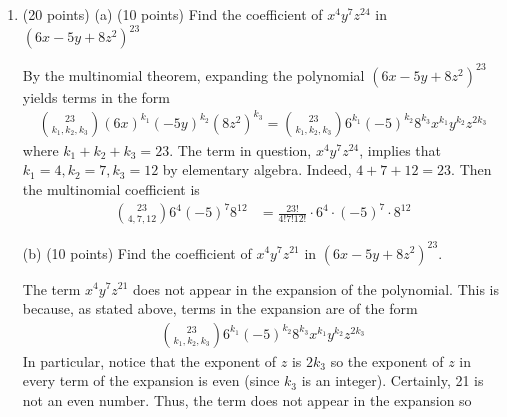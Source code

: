 \documentclass[12pt]{article}
\begin{document}
\begin{enumerate}
\begin{enumerate}
      \item (10 points) \(x_{1} + x_{2} + x_{3} = 42 \qquad x_{1}, x_{3} > 0, \quad 0 < x_{2} \leq 6\)

      \(x_{1}\) and \(x_{3}\) can be treated in the same way as part (a). To account for the upper bound on \(x_{2}\), we subtract the number of partitions where \(x_{2} > 6\). To calculate this second number, we set aside 6 of the 42 objects to go towards \(x_{3}\) so that they can no longer be chosen. We find there are \({41 \choose 3} - {35 \choose 3} = \) 
    \end{enumerate}

    \pagebreak

    \item (20 points) (a) (10 points) Find the coefficient of \(x^{4}y^{7}z^{24}\) in \((6x - 5y + 8z^{2})^{23}\)

    By the multinomial theorem, expanding the polynomial \((6x - 5y + 8z^{2})^{23}\) yields terms in the form
    \begin{align*}
      {23 \choose k_{1}, k_{2}, k_{3}}(6x)^{k_{1}}(-5y)^{k_{2}}(8z^{2})^{k_{3}} = {23 \choose k_{1}, k_{2}, k_{3}}6^{k_{1}}(-5)^{k_{2}}8^{k_{3}}x^{k_{1}}y^{k_{2}}z^{2k_{3}}
    \end{align*}
    where \(k_{1} + k_{2} + k_{3} = 23\). The term in question, \(x^{4}y^{7}z^{24}\), implies that \(k_{1} = 4, k_{2} = 7, k_{3} = 12\) by elementary algebra. Indeed, \(4 + 7 + 12 = 23\). Then the multinomial coefficient is
    \begin{align*}
      {23 \choose 4, 7, 12}6^{4}(-5)^{7}8^{12} &= \boxed{\frac{23!}{4! 7! 12!} \cdot 6^{4} \cdot (-5)^{7} \cdot 8^{12}}
    \end{align*}

    (b) (10 points) Find the coefficient of \(x^{4}y^{7}z^{21}\) in \((6x - 5y + 8z^{2})^{23}\).

    The term \(x^{4}y^{7}z^{21}\) does not appear in the expansion of the polynomial. This is because, as stated above, terms in the expansion are of the form
    \begin{align*}
      {23 \choose k_{1}, k_{2}, k_{3}}6^{k_{1}}(-5)^{k_{2}}8^{k_{3}}x^{k_{1}}y^{k_{2}}z^{2k_{3}}
    \end{align*}
    In particular, notice that the exponent of \(z\) is \(2 k_{3}\) so the exponent of \(z\) in every term of the expansion is even (since \(k_{3} \) is an integer). Certainly, 21 is not an even number. Thus, the term does not appear in the expansion so 


\end{enumerate}
\end{document}
